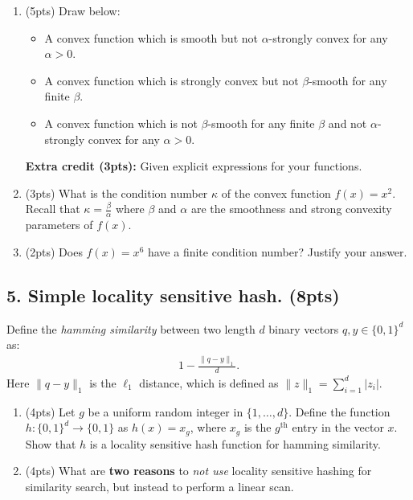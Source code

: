 \documentclass[10pt]{article}
\begin{document}
\begin{enumerate}[label=(\alph*)]
	\item (5pts) Draw below:
	\begin{itemize}
		\item A convex function which is smooth but not $\alpha$-strongly convex for any $\alpha > 0$.
		\item A convex function which is strongly convex but not $\beta$-smooth for any finite $\beta$. 
		\item A convex function which is not $\beta$-smooth for any finite $\beta$ and not $\alpha$-strongly convex for any $\alpha > 0$.
	\end{itemize} 
	\textbf{Extra credit (3pts):} Given explicit expressions for your functions.
	\vspace{20em}
	
	\item (3pts) What is the condition number  $\kappa$ of the convex function $f(x) = x^2$. Recall that $\kappa = \frac{\beta}{\alpha}$ where $\beta$ and $\alpha$ are the smoothness and strong convexity parameters of $f(x)$. 
	\vspace{14em}
	
	\item (2pts) Does $f(x) = x^6$ have a finite condition number? Justify your answer. 
	\vspace{4em}
\end{enumerate}


\vspace{8em}

\newpage

\subsection{5. Simple locality sensitive hash. (\textbf{\small 8pts})}
Define the \emph{hamming similarity} between two length $d$ binary vectors $q,y \in \{0,1\}^d$ as:
\begin{align*}
	1 - \frac{\|q - y\|_1}{d}.
\end{align*}
Here $\|q - y\|_1$ is the $\ell_1$ distance, which is defined as $\|z\|_1 = \sum_{i=1}^d |z_i|$.

\begin{enumerate}[label=(\alph*)]
	\item (4pts) 
	Let $g$ be a uniform random integer in $\{1, \ldots, d\}$. Define the function $h: \{0,1\}^d \rightarrow \{0,1\}$ as $h(x) = x_g$, where $x_g$ is the $g^\text{th}$ entry in the vector $x$. Show that $h$ is a locality sensitive hash function for {hamming similarity}.
	\vspace{10em}
	
	\item (4pts) What are \textbf{two reasons} to \emph{not use} locality sensitive hashing for similarity search, but instead to perform a linear scan. 
	\vspace{8em}
\end{enumerate}
\end{document}

